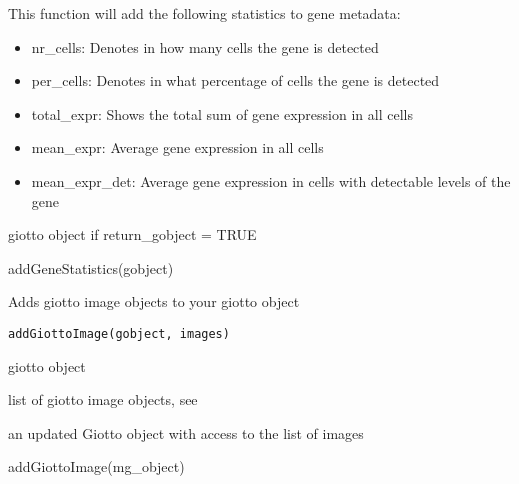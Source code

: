 \documentclass[a4paper]{book}
\begin{document}
%
\begin{Details}\relax
This function will add the following statistics to gene metadata:
\begin{itemize}

\item{} nr\_cells: Denotes in how many cells the gene is detected
\item{} per\_cells: Denotes in what percentage of cells the gene is detected
\item{} total\_expr: Shows the total sum of gene expression in all cells
\item{} mean\_expr: Average gene expression in all cells
\item{} mean\_expr\_det: Average gene expression in cells with detectable levels of the gene

\end{itemize}

\end{Details}
%
\begin{Value}
giotto object if return\_gobject = TRUE
\end{Value}
%
\begin{Examples}
\begin{ExampleCode}
    addGeneStatistics(gobject)
\end{ExampleCode}
\end{Examples}
%
\begin{Description}\relax
Adds giotto image objects to your giotto object
\end{Description}
%
\begin{Usage}
\begin{verbatim}
addGiottoImage(gobject, images)
\end{verbatim}
\end{Usage}
%
\begin{Arguments}
\begin{ldescription}
\item[\code{gobject}] giotto object

\item[\code{images}] list of giotto image objects, see 
\end{ldescription}
\end{Arguments}
%
\begin{Value}
an updated Giotto object with access to the list of images
\end{Value}
%
\begin{Examples}
\begin{ExampleCode}
    addGiottoImage(mg_object)
\end{ExampleCode}
\end{Examples}
\end{document}
